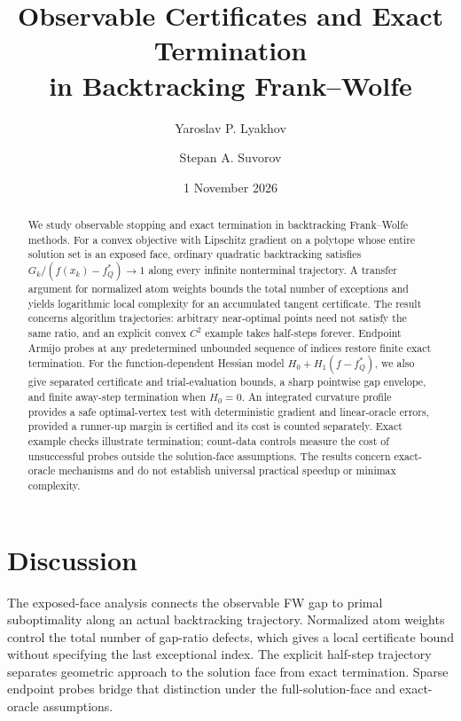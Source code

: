 \documentclass[a4paper,11pt]{article}
\title{Observable Certificates and Exact Termination\\in Backtracking Frank--Wolfe}
\author{Yaroslav P. Lyakhov \and Stepan A. Suvorov}
\date{1 November 2026}
\begin{document}
\maketitle
\begin{abstract}
We study observable stopping and exact termination in backtracking
Frank--Wolfe methods. For a convex objective with Lipschitz gradient on a
polytope whose entire solution set is an exposed face, ordinary quadratic
backtracking satisfies $G_k/(f(x_k)-f_Q^*)\to1$ along every infinite
nonterminal trajectory. A transfer argument for normalized atom weights
bounds the total number of exceptions and yields logarithmic local
complexity for an accumulated tangent certificate. The result concerns
algorithm trajectories: arbitrary near-optimal points need not satisfy
the same ratio, and an explicit convex $C^2$ example takes half-steps
forever. Endpoint Armijo probes at any predetermined unbounded sequence
of indices restore finite exact termination. For the function-dependent
Hessian model $H_0+H_1(f-f_Q^*)$, we also give separated certificate and
trial-evaluation bounds, a sharp pointwise gap envelope, and finite
away-step termination when $H_0=0$. An integrated curvature profile
provides a safe optimal-vertex test with deterministic gradient and
linear-oracle errors, provided a runner-up margin is certified and its
cost is counted separately. Exact example checks illustrate termination;
count-data controls measure the cost of unsuccessful probes outside the
solution-face assumptions. The results concern exact-oracle mechanisms
and do not establish universal practical speedup or minimax complexity.
\end{abstract}









\section{Discussion}
The exposed-face analysis connects the observable FW gap to primal
suboptimality along an actual backtracking trajectory. Normalized atom
weights control the total number of gap-ratio defects, which gives a
local certificate bound without specifying the last exceptional index.
The explicit half-step trajectory separates geometric approach to the
solution face from exact termination. Sparse endpoint probes bridge
that distinction under the full-solution-face and exact-oracle
assumptions.
\end{document}
